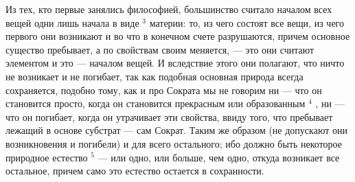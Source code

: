 \documentclass[oneside, 17pt, dvipsnames]{extbook}
\begin{document}
Из тех, кто первые занялись философией, большинство считало началом всех вещей одни лишь начала в виде $^3$ материи: то, из чего состоят все вещи, из чего первого они возникают и во что в конечном счете разрушаются, причем основное существо пребывает, а по свойствам своим меняется, — это они считают элементом и это — началом вещей. И вследствие этого они полагают, что ничто не возникает и не погибает, так как подобная основная природа всегда сохраняется, подобно тому, как и про Сократа мы не говорим ни — что он становится просто, когда он становится прекрасным или образованным $^4$ , ни — что он погибает, когда он утрачивает эти свойства, ввиду того, что пребывает лежащий в основе субстрат — сам Сократ. Таким же образом (не допускают они возникновения и погибели) и для всего остального; ибо должно быть некоторое природное естество $^5$ — или одно, или больше, чем одно, откуда возникает все остальное, причем само это естество остается в сохранности.
\end{document}
